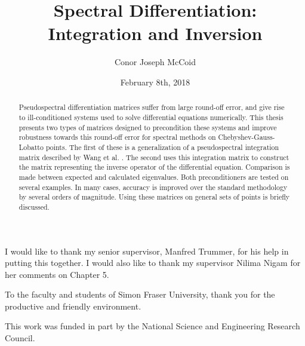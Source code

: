 \documentclass{sfuthesis}
\title{Spectral Differentiation: Integration and Inversion}
\author{Conor Joseph McCoid}
\date{February 8th, 2018}
\begin{document}
\frontmatter
\maketitle{}
\makecommittee{}


\begin{abstract}
	Pseudospectral differentiation matrices suffer from large round-off error, and give rise to ill-conditioned systems used to solve differential equations numerically.
	This thesis presents two types of matrices designed to precondition these systems and improve robustness towards this round-off error for spectral methods on Chebyshev-Gauss-Lobatto points.
	The first of these is a generalization of a pseudospectral integration matrix described by Wang et al. \cite{wang2014well}.
	The second uses this integration matrix to construct the matrix representing the inverse operator of the differential equation.
	Comparison is made between expected and calculated eigenvalues.
	Both preconditioners are tested on several examples.
	In many cases, accuracy is improved over the standard methodology by several orders of magnitude.
	Using these matrices on general sets of points is briefly discussed.
\end{abstract}




\begin{acknowledgements}
	I would like to thank my senior supervisor, Manfred Trummer, for his help in putting this together.
	I would also like to thank my supervisor Nilima Nigam for her comments on Chapter 5.

	To the faculty and students of Simon Fraser University, thank you for the productive and friendly environment.

	This work was funded in part by the National Science and Engineering Research Council.
\end{acknowledgements}

%
\tableofcontents%
\clearpage


%
\listoffigures%
\clearpage
\end{document}
